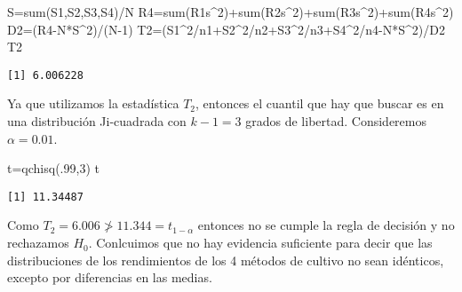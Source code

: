 \documentclass[
  a4paper,
  oneside,
  openany]{book}
\newenvironment{Shaded}{\begin{snugshade}}{\end{snugshade}}
\newcommand{\DecValTok}[1]{\textcolor[rgb]{0.00,0.00,0.81}{#1}}
\newcommand{\FunctionTok}[1]{\textcolor[rgb]{0.00,0.00,0.00}{#1}}
\newcommand{\NormalTok}[1]{#1}
\newcommand{\OtherTok}[1]{\textcolor[rgb]{0.56,0.35,0.01}{#1}}
\newcommand{\SpecialCharTok}[1]{\textcolor[rgb]{0.00,0.00,0.00}{#1}}
\begin{document}
\begin{Shaded}
\begin{Highlighting}[]
\NormalTok{S}\OtherTok{=}\FunctionTok{sum}\NormalTok{(S1,S2,S3,S4)}\SpecialCharTok{/}\NormalTok{N}
\NormalTok{R4}\OtherTok{=}\FunctionTok{sum}\NormalTok{(R1s}\SpecialCharTok{\^{}}\DecValTok{2}\NormalTok{)}\SpecialCharTok{+}\FunctionTok{sum}\NormalTok{(R2s}\SpecialCharTok{\^{}}\DecValTok{2}\NormalTok{)}\SpecialCharTok{+}\FunctionTok{sum}\NormalTok{(R3s}\SpecialCharTok{\^{}}\DecValTok{2}\NormalTok{)}\SpecialCharTok{+}\FunctionTok{sum}\NormalTok{(R4s}\SpecialCharTok{\^{}}\DecValTok{2}\NormalTok{)}
\NormalTok{D2}\OtherTok{=}\NormalTok{(R4}\SpecialCharTok{{-}}\NormalTok{N}\SpecialCharTok{*}\NormalTok{S}\SpecialCharTok{\^{}}\DecValTok{2}\NormalTok{)}\SpecialCharTok{/}\NormalTok{(N}\DecValTok{{-}1}\NormalTok{)}
\NormalTok{T2}\OtherTok{=}\NormalTok{(S1}\SpecialCharTok{\^{}}\DecValTok{2}\SpecialCharTok{/}\NormalTok{n1}\SpecialCharTok{+}\NormalTok{S2}\SpecialCharTok{\^{}}\DecValTok{2}\SpecialCharTok{/}\NormalTok{n2}\SpecialCharTok{+}\NormalTok{S3}\SpecialCharTok{\^{}}\DecValTok{2}\SpecialCharTok{/}\NormalTok{n3}\SpecialCharTok{+}\NormalTok{S4}\SpecialCharTok{\^{}}\DecValTok{2}\SpecialCharTok{/}\NormalTok{n4}\SpecialCharTok{{-}}\NormalTok{N}\SpecialCharTok{*}\NormalTok{S}\SpecialCharTok{\^{}}\DecValTok{2}\NormalTok{)}\SpecialCharTok{/}\NormalTok{D2}
\NormalTok{T2}
\end{Highlighting}
\end{Shaded}

\begin{verbatim}
[1] 6.006228
\end{verbatim}

Ya que utilizamos la estadística \(T_2\), entonces el cuantil que hay que buscar es en una distribución Ji-cuadrada con \(k-1=3\) grados de libertad. Consideremos \(\alpha=0.01\).

\begin{Shaded}
\begin{Highlighting}[]
\NormalTok{t}\OtherTok{=}\FunctionTok{qchisq}\NormalTok{(.}\DecValTok{99}\NormalTok{,}\DecValTok{3}\NormalTok{)}
\NormalTok{t}
\end{Highlighting}
\end{Shaded}

\begin{verbatim}
[1] 11.34487
\end{verbatim}

Como \(T_2=6.006\ngtr11.344=t_{1-\alpha}\) entonces no se cumple la regla de decisión y no rechazamos \(H_0\). Conlcuimos que no hay evidencia suficiente para decir que las distribuciones de los rendimientos de los 4 métodos de cultivo no sean idénticos, excepto por diferencias en las medias.
\end{document}
